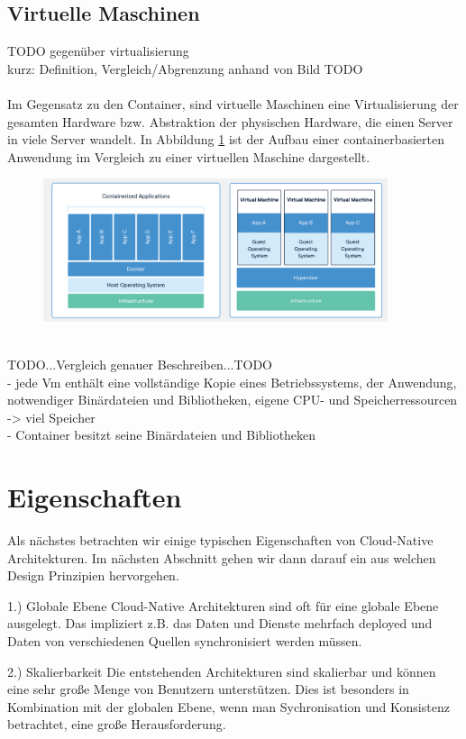 \subsection{Virtuelle Maschinen}
TODO gegenüber virtualisierung\\
kurz: Definition, Vergleich/Abgrenzung anhand von Bild TODO\\
\\
Im Gegensatz zu den Container, sind virtuelle Maschinen eine Virtualisierung der gesamten Hardware bzw. Abstraktion der physischen Hardware, die einen Server in viele Server wandelt. In Abbildung \ref{vm} ist der Aufbau einer containerbasierten Anwendung im Vergleich zu einer virtuellen Maschine dargestellt.
\begin{figure}[bth] 
	\centering
	\includegraphics[width=0.9\textwidth]{Graphics/containerVsVm.png}
	\caption{}
	\label{vm}
\end{figure}\\
TODO...Vergleich genauer Beschreiben...TODO\\
- jede Vm enthält eine vollständige Kopie eines Betriebssystems, der Anwendung, notwendiger Binärdateien und Bibliotheken, eigene CPU- und Speicherressourcen -> viel Speicher\\
- Container besitzt seine Binärdateien und Bibliotheken\\

\section{Eigenschaften}
Als nächstes betrachten wir einige typischen Eigenschaften von Cloud-Native Architekturen. Im nächsten Abschnitt gehen wir dann darauf ein aus welchen Design Prinzipien hervorgehen.

1.) Globale Ebene
Cloud-Native Architekturen sind oft für eine globale Ebene ausgelegt. Das impliziert z.B. das Daten und Dienste mehrfach deployed und Daten von verschiedenen Quellen synchronisiert werden müssen.

2.) Skalierbarkeit
Die entstehenden Architekturen sind skalierbar und können eine sehr große Menge von Benutzern unterstützen. Dies ist besonders in Kombination mit der globalen Ebene, wenn man Sychronisation und Konsistenz betrachtet, eine große Herausforderung.

